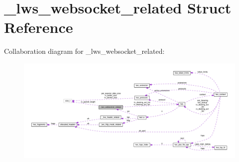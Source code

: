 \hypertarget{struct__lws__websocket__related}{}\section{\+\_\+lws\+\_\+websocket\+\_\+related Struct Reference}
\label{struct__lws__websocket__related}


Collaboration diagram for \+\_\+lws\+\_\+websocket\+\_\+related\+:
\nopagebreak
\begin{figure}[H]
\begin{center}
\leavevmode
\includegraphics[width=350pt]{struct__lws__websocket__related__coll__graph}
\end{center}
\end{figure}
